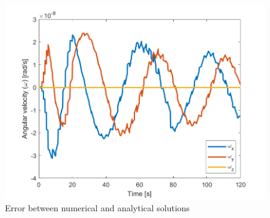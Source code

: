\begin{figure}[H]
\centering
\includegraphics[scale=0.6]{Images/ps3_problem3.png}
\caption{Error between numerical and analytical solutions}
\label{fig:ps3_problem3}
\end{figure}


